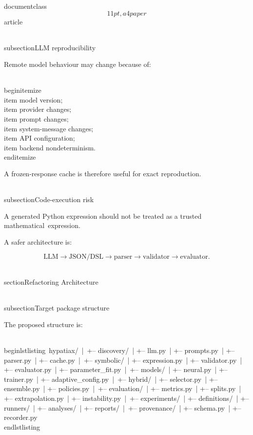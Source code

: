 \\documentclass\[11pt,a4paper\]{article}
\begin{document}
 \\subsection{LLM reproducibility}

 Remote model behaviour may change because of:

 \\begin{itemize}\
 \\item model version;\
 \\item provider changes;\
 \\item prompt changes;\
 \\item system-message changes;\
 \\item API configuration;\
 \\item backend nondeterminism.\
 \\end{itemize}

 A frozen-response cache is therefore useful for exact reproduction.

 \\subsection{Code-execution risk}

 A generated Python expression should not be treated as a trusted mathematical\
 expression.

 A safer architecture is:

 $$
\text{LLM}
\rightarrow
\text{JSON/DSL}
\rightarrow
\text{parser}
\rightarrow
\text{validator}
\rightarrow
\text{evaluator}.
$$

 \\section{Refactoring Architecture}\

 \\subsection{Target package structure}

 The proposed structure is:

 \\begin{lstlisting}\
 hypatiax/\
 |\
 +-- discovery/\
 | +-- llm.py\
 | +-- prompts.py\
 | +-- parser.py\
 | +-- cache.py\
 |\
 +-- symbolic/\
 | +-- expression.py\
 | +-- validator.py\
 | +-- evaluator.py\
 | +-- parameter\_fit.py\
 |\
 +-- models/\
 | +-- neural.py\
 | +-- trainer.py\
 | +-- adaptive\_config.py\
 |\
 +-- hybrid/\
 | +-- selector.py\
 | +-- ensemble.py\
 | +-- policies.py\
 |\
 +-- evaluation/\
 | +-- metrics.py\
 | +-- splits.py\
 | +-- extrapolation.py\
 | +-- instability.py\
 |\
 +-- experiments/\
 | +-- definitions/\
 | +-- runners/\
 | +-- analyses/\
 | +-- reports/\
 |\
 +-- provenance/\
 | +-- schema.py\
 | +-- recorder.py\
 \\end{lstlisting}
\end{document}
